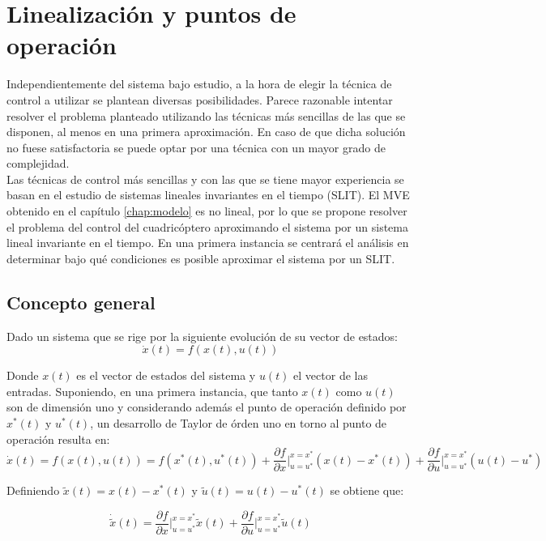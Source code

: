 \documentclass[main]{subfiles}
\begin{document}
\chapter{Linealizaci\'on y puntos de operaci\'on}
\label{chap:linealizacion}

Independientemente del sistema bajo estudio, a la hora de elegir la t\'ecnica de control a utilizar se plantean diversas posibilidades. Parece razonable intentar resolver el problema planteado utilizando las t\'ecnicas m\'as sencillas de las que se disponen, al menos en una primera aproximaci\'on. En caso de que dicha soluci\'on no fuese satisfactoria se puede optar por una t\'ecnica con un mayor grado de complejidad.\\ 

Las t\'ecnicas de control m\'as sencillas y con las que se tiene mayor experiencia se basan en el estudio de sistemas lineales invariantes en el tiempo (SLIT). El MVE obtenido en el cap\'itulo \ref{chap:modelo} es no lineal, por lo que se propone resolver el problema del control del cuadric\'optero aproximando el sistema por un sistema lineal invariante en el tiempo. En una primera instancia se centrar\'a el an\'alisis en determinar bajo qu\'e condiciones es posible aproximar el sistema por un SLIT.

\section{Concepto general}
Dado un sistema que se rige por la siguiente evoluci\'on de su vector de estados:
\begin{equation}
\dot{x}(t)=f(x(t),u(t))
\end{equation}

Donde $x(t)$ es el vector de estados del sistema y $u(t)$ el vector de las entradas. Suponiendo, en una primera instancia, que tanto $x(t)$ como $u(t)$ son de dimensi\'on uno y considerando adem\'as el punto de operaci\'on definido por $x^*(t)$ y $u^*(t)$, un desarrollo de Taylor de \'orden uno en torno al punto de operaci\'on resulta en:
\begin{equation}
\dot{x}(t)=f(x(t),u(t))=f(x^*(t),u^*(t))+\frac{\partial f}{\partial x}\vert_{u=u^*}^{x=x^*}(x(t)-x^*(t))+\frac{\partial f}{\partial u}\vert_{u=u^*}^{x=x^*}(u(t)-u^*)
\end{equation}

Definiendo $\tilde{x}(t)=x(t)-x^*(t)$ y $\tilde{u}(t)=u(t)-u^*(t)$ se obtiene que:

\begin{equation}
\dot{\tilde{x}}(t)=\frac{\partial f}{\partial x}\vert_{u=u^*}^{x=x^*}\tilde{x}(t)+\frac{\partial f}{\partial u}\vert_{u=u^*}^{x=x^*}\tilde{u}(t)
\end{equation}
\end{document}
